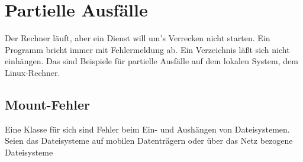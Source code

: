 \chapter{Partielle Ausfälle}
\label{cha:partielle-ausfaelle}

\begin{abstractsec}
  Der Rechner läuft, aber ein Dienst will um's Verrecken nicht starten. Ein
  Programm bricht immer mit Fehlermeldung ab. Ein Verzeichnis läßt sich nicht
  einhängen. Das sind Beispiele für partielle Ausfälle auf dem lokalen System,
  dem Linux-Rechner.
\end{abstractsec}

\section{Mount-Fehler}
\label{sec:mount-fehler}

\begin{abstractsec}
  Eine Klasse für sich sind Fehler beim Ein- und Aushängen von Dateisystemen.
  Seien das Dateisysteme auf mobilen Datenträgern oder über das Netz bezogene
  Dateisysteme
\end{abstractsec}

